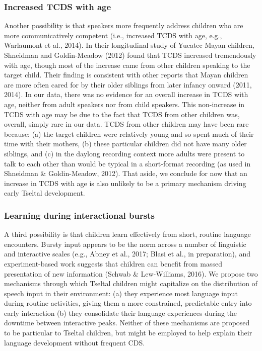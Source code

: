 \documentclass[floatsintext,man]{apa6}
\theoremstyle{definition}
\theoremstyle{definition}
\theoremstyle{definition}
\theoremstyle{remark}
\begin{document}
\subsubsection{Increased TCDS with age}\label{increased-tcds-with-age}

Another possibility is that speakers more frequently address children
who are more communicatively competent (i.e., increased TCDS with age,
e.g., Warlaumont et al., 2014). In their longitudinal study of Yucatec
Mayan children, Shneidman and Goldin-Meadow (2012) found that TCDS
increased tremendously with age, though most of the increase came from
other children speaking to the target child. Their finding is consistent
with other reports that Mayan children are more often cared for by their
older siblings from later infancy onward (2011, 2014). In our data,
there was no evidence for an overall increase in TCDS with age, neither
from adult speakers nor from child speakers. This non-increase in TCDS
with age may be due to the fact that TCDS from other children was,
overall, simply rare in our data. TCDS from other children may have been
rare because: (a) the target children were relatively young and so spent
much of their time with their mothers, (b) these particular children did
not have many older siblings, and (c) in the daylong recording context
more adults were present to talk to each other than would be typical in
a short-format recording (as used in Shneidman \& Goldin-Meadow, 2012).
That aside, we conclude for now that an increase in TCDS with age is
also unlikely to be a primary mechanism driving early Tseltal
development.

\subsubsection{Learning during interactional
bursts}\label{learning-during-interactional-bursts}

A third possibility is that children learn effectively from short,
routine language encounters. Bursty input appears to be the norm across
a number of linguistic and interactive scales (e.g., Abney et al., 2017;
Blasi et al., in preparation), and experiment-based work suggests that
children can benefit from massed presentation of new information (Schwab
\& Lew-Williams, 2016). We propose two mechanisms through which Tseltal
children might capitalize on the distribution of speech input in their
environment: (a) they experience most language input during routine
activities, giving them a more constrained, predictable entry into early
interaction (b) they consolidate their language experiences during the
downtime between interactive peaks. Neither of these mechanisms are
proposed to be particular to Tseltal children, but might be employed to
help explain their language development without frequent CDS.
\end{document}
